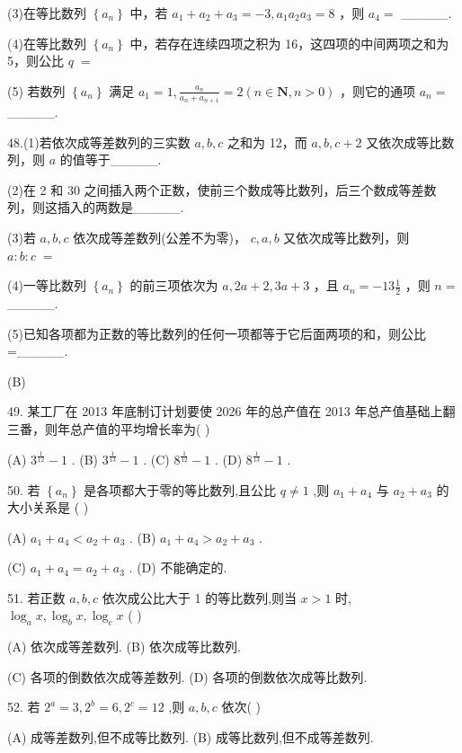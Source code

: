 \documentclass[10pt]{article}
\begin{document}
(3)在等比数列 \(\left\{  {a}_{n}\right\}\) 中，若 \({a}_{1} + {a}_{2} + {a}_{3} =  - 3,{a}_{1}{a}_{2}{a}_{3} = 8\) ，则 \({a}_{4} =\) \_\_\_\_\_.

(4)在等比数列 \(\left\{  {a}_{n}\right\}\) 中，若存在连续四项之积为 16，这四项的中间两项之和为 5，则公比 \(q \; =\)

(5) 若数列 \(\left\{  {a}_{n}\right\}\) 满足 \({a}_{1} = 1,\frac{{a}_{n}}{{a}_{n} + {a}_{n + 1}} = 2\left( {n \in  \mathbf{N},n > 0}\right)\) ，则它的通项 \({a}_{n} =\) \_\_\_\_\_.

48.(1)若依次成等差数列的三实数 \(a,b,c\) 之和为 12，而 \(a,b,c + 2\) 又依次成等比数列，则 \(a\) 的值等于\_\_\_\_\_.

(2)在 2 和 30 之间插入两个正数，使前三个数成等比数列，后三个数成等差数列，则这插入的两数是\_\_\_\_\_.

(3)若 \(a,b,c\) 依次成等差数列(公差不为零)， \(c,a,b\) 又依次成等比数列，则 \(a : b : c \; =\)

(4)一等比数列 \(\left\{  {a}_{n}\right\}\) 的前三项依次为 \(a,{2a} + 2,{3a} + 3\) ，且 \({a}_{n} =  - {13}\frac{1}{2}\) ，则 \(n =\) \_\_\_\_\_.

(5)已知各项都为正数的等比数列的任何一项都等于它后面两项的和，则公比 =\_\_\_\_\_.

(B)

49. 某工厂在 2013 年底制订计划要使 2026 年的总产值在 2013 年总产值基础上翻三番，则年总产值的平均增长率为( )

(A) \({3}^{\frac{1}{12}} - 1\) . (B) \({3}^{\frac{1}{13}} - 1\) . (C) \({8}^{\frac{1}{12}} - 1\) . (D) \({8}^{\frac{1}{13}} - 1\) .

50. 若 \(\left\{  {a}_{n}\right\}\) 是各项都大于零的等比数列,且公比 \(q \neq  1\) ,则 \({a}_{1} + {a}_{4}\) 与 \({a}_{2} + {a}_{3}\) 的大小关系是 ( )

(A) \({a}_{1} + {a}_{4} < {a}_{2} + {a}_{3}\) . (B) \({a}_{1} + {a}_{4} > {a}_{2} + {a}_{3}\) .

(C) \({a}_{1} + {a}_{4} = {a}_{2} + {a}_{3}\) . (D) 不能确定的.

51. 若正数 \(a,b,c\) 依次成公比大于 1 的等比数列,则当 \(x > 1\) 时, \({\log }_{a}x,{\log }_{b}x,{\log }_{c}x\) ( )

(A) 依次成等差数列. (B) 依次成等比数列.

(C) 各项的倒数依次成等差数列. (D) 各项的倒数依次成等比数列.

52. 若 \({2}^{a} = 3,{2}^{b} = 6,{2}^{c} = {12}\) ,则 \(a,b,c\) 依次(   )

(A) 成等差数列,但不成等比数列. (B) 成等比数列,但不成等差数列.
\end{document}
